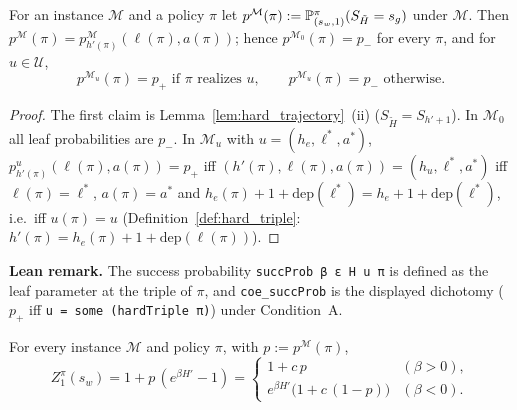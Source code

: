 \begin{lemma}\label{lem:hard_success}
\leanok
For an instance $\mathcal M$ and a policy $\pi$ let
$p^{\mathcal M}(\pi) := \mathbb{P}^{\pi}_{(s_w,1)}(S_{\tilde H} = s_g)$ under $\mathcal M$. Then
$p^{\mathcal M}(\pi) = p^{\mathcal M}_{h'(\pi)}(\ell(\pi), a(\pi))$; hence
$p^{\mathcal M_0}(\pi) = p_-$ for every $\pi$, and for $u \in \mathcal U$,
\[
  p^{\mathcal M_u}(\pi) = p_+ \text{ if } \pi \text{ realizes } u, \qquad p^{\mathcal M_u}(\pi) = p_- \text{ otherwise.}
\]
\end{lemma}

\begin{proof}
\leanok
{}
The first claim is Lemma~\ref{lem:hard_trajectory}~(ii) ($S_{\tilde H} = S_{h'+1}$). In
$\mathcal M_0$ all leaf probabilities are $p_-$. In $\mathcal M_u$ with $u = (h_e, \ell^*, a^*)$,
$p^{u}_{h'(\pi)}(\ell(\pi), a(\pi)) = p_+$ iff $(h'(\pi), \ell(\pi), a(\pi)) = (h_u, \ell^*, a^*)$ iff
$\ell(\pi) = \ell^*$, $a(\pi) = a^*$ and $h_e(\pi) + 1 + \mathrm{dep}(\ell^*) = h_e + 1 + \mathrm{dep}(\ell^*)$,
i.e.\ iff $u(\pi) = u$ (Definition~\ref{def:hard_triple}: $h'(\pi) = h_e(\pi) + 1 + \mathrm{dep}(\ell(\pi))$).
\end{proof}

\textbf{Lean remark.} The success probability \texttt{succProb β ε H u π} is defined as the leaf parameter
at the triple of $\pi$, and \texttt{coe\_succProb} is the displayed dichotomy
($p_+$ iff \texttt{u = some (hardTriple π)}) under Condition~A.

\begin{lemma}\label{lem:hard_exp_value}
\leanok
For every instance $\mathcal M$ and policy $\pi$, with $p := p^{\mathcal M}(\pi)$,
\[
  Z^\pi_1(s_w) = 1 + p\,(e^{\beta H'} - 1) = \begin{cases} 1 + c\,p & (\beta > 0), \\ e^{\beta H'}\big(1 + c\,(1 - p)\big) & (\beta < 0). \end{cases}
\]
\end{lemma}

